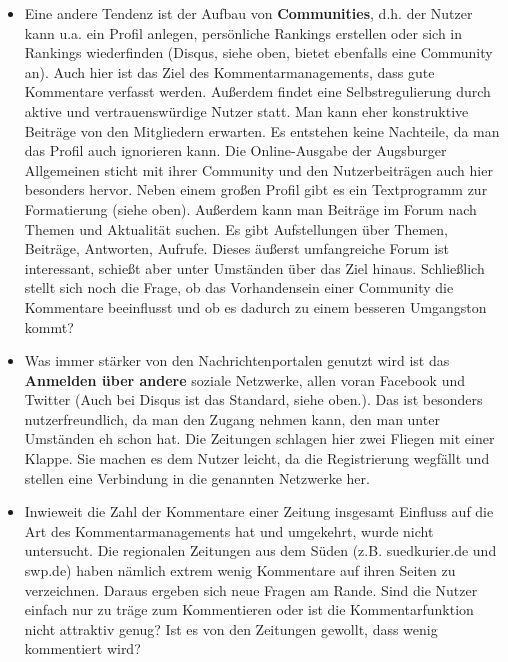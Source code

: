 \begin{itemize}
  \item Eine andere Tendenz ist der Aufbau von {\bfseries Communities}, d.h. der Nutzer kann u.a.
    ein Profil anlegen, persönliche Rankings erstellen oder sich in Rankings wiederfinden (Disqus,
    siehe oben,  bietet ebenfalls eine Community an). Auch hier ist das Ziel des
    Kommentarmanagements, dass gute Kommentare verfasst werden. Außerdem findet eine
    Selbstregulierung durch aktive und vertrauenswürdige Nutzer statt. Man kann eher konstruktive
    Beiträge von den Mitgliedern erwarten. Es entstehen keine Nachteile, da man das Profil auch
    ignorieren kann.  Die Online-Ausgabe der Augsburger Allgemeinen sticht mit ihrer Community und
    den Nutzerbeiträgen auch hier besonders hervor. Neben einem großen Profil gibt es ein
    Textprogramm zur Formatierung (siehe oben). Außerdem kann man Beiträge im Forum nach Themen und
    Aktualität suchen. Es gibt Aufstellungen über Themen, Beiträge, Antworten, Aufrufe. Dieses
    äußerst umfangreiche Forum ist interessant, schießt aber unter Umständen über das Ziel hinaus.
    Schließlich stellt sich noch die Frage, ob das Vorhandensein einer Community die Kommentare
    beeinflusst und ob es dadurch zu einem besseren Umgangston kommt?

  \item Was immer stärker von den Nachrichtenportalen genutzt wird ist das {\bfseries Anmelden über
    andere} soziale Netzwerke, allen voran Facebook und Twitter (Auch bei Disqus ist das Standard,
    siehe oben.). Das ist besonders nutzerfreundlich, da man den Zugang nehmen kann, den man unter
    Umständen eh schon hat. Die Zeitungen schlagen hier zwei Fliegen mit einer Klappe. Sie machen es
    dem Nutzer leicht, da die Registrierung wegfällt und stellen eine Verbindung in die genannten
    Netzwerke her.

  \item Inwieweit die Zahl der Kommentare einer Zeitung insgesamt Einfluss auf die Art des
    Kommentarmanagements hat und umgekehrt, wurde nicht untersucht. Die regionalen Zeitungen aus dem
    Süden (z.B. suedkurier.de und swp.de) haben nämlich extrem wenig Kommentare auf ihren Seiten zu
    verzeichnen.  Daraus ergeben sich neue Fragen am Rande. Sind die Nutzer einfach nur zu träge zum
    Kommentieren oder ist die Kommentarfunktion nicht attraktiv genug? Ist es von den Zeitungen
    gewollt, dass wenig kommentiert wird? 
\end{itemize}




